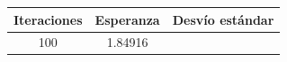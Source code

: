 \documentclass[10pt,a4paper]{article} %
\begin{document}
                                                                                                                                                                                                                                                                                                                                                                                                                                                        
                                                                                                                                                                                                                                                                                                                                                                                                                                                            \begin{center}
                                                                                                                                                                                                                                                                                                                                                                                                                                                                    \begin{tabular}{ c| c| c}
                                                                                                                                                                                                                                                                                                                                                                                                                                                                                Iteraciones & Esperanza & Desv\'io
                                                                                                                                                                                                                                                                                                                                                                                                                                                                                est\'andar \\ \hline
                                                                                                                                                                                                                                                                                                                                                                                                                                                                                            100&    1.84916 &

\end{tabular}
\end{center}
\end{document}
